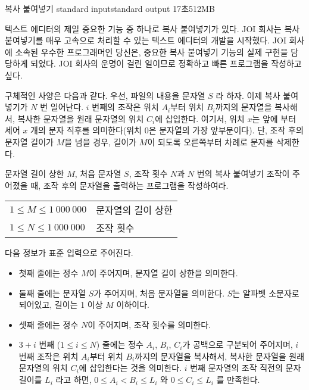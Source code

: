 \begin{problem}{복사 붙여넣기}
	{standard input}{standard output}
	{17초}{512MB}{}
	
	텍스트 에디터의 제일 중요한 기능 중 하나로 복사 붙여넣기가 있다. JOI 회사는 복사 붙여넣기를 매우 고속으로 처리할 수 있는 텍스트 에디터의 개발을 시작했다. JOI 회사에 소속된 우수한 프로그래머인 당신은, 중요한 복사 붙여넣기 기능의 실제 구현을 담당하게 되었다. JOI 회사의 운명이 걸린 일이므로 정확하고 빠른 프로그램을 작성하고 싶다.
	
	구체적인 사양은 다음과 같다. 우선, 파일의 내용을 문자열 $S$ 라 하자. 이제 복사 붙여넣기가 $N$ 번 일어난다. $i$ 번째의 조작은 위치 $A_i$부터 위치 $B_i$까지의 문자열을 복사해서, 복사한 문자열을 원래 문자열의 위치 $C_i$에 삽입한다. 여기서, 위치 $x$는 앞에 부터 세어 $x$ 개의 문자 직후를 의미한다(위치 0은 문자열의 가장 앞부분이다). 단, 조작 후의 문자열 길이가 $M$을 넘을 경우, 길이가 $M$이 되도록 오른쪽부터 차례로 문자를 삭제한다. 
	
	문자열 길이 상한 $M$, 처음 문자열 $S$, 조작 횟수 $N$과 $N$ 번의 복사 붙여넣기 조작이 주어졌을 때, 조작 후의 문자열을 출력하는 프로그램을 작성하여라.
	
	\Constraints
	
	
	\begin{tabular}{ll}
		$1 \le M \le 1\ 000\ 000$ & 문자열의 길이 상한 \\
		$1 \le N \le 1\ 000\ 000$ & 조작 횟수 \\
	\end{tabular}
	
	
	\InputFile
	
	다음 정보가 표준 입력으로 주어진다.
	
	\begin{itemize}
		\item 첫째 줄에는 정수 $M$이 주어지며, 문자열 길이 상한을 의미한다.
		\item 둘째 줄에는 문자열 $S$가 주어지며, 처음 문자열을 의미한다. $S$는 알파벳 소문자로 되어있고, 길이는 1 이상 $M$ 이하이다.
		\item 셋째 줄에는 정수 $N$이 주어지며, 조작 횟수를 의미한다.
		\item $3+i$ 번째 ($1 \le i \le N$) 줄에는 정수 $A_i$, $B_i$, $C_i$가 공백으로 구분되어 주어지며, $i$ 번째 조작은  위치 $A_i$부터 위치 $B_i$까지의 문자열을 복사해서, 복사한 문자열을 원래 문자열의 위치 $C_i$에 삽입한다는 것을 의미한다. $i$ 번째 문자열의 조작 직전의 문자 길이를 $L_i$ 라고 하면, $0 \le A_i < B_i \le L_i$ 와 $0 \le C_i \le L_i$ 를 만족한다.
	\end{itemize}
	

\end{problem}
